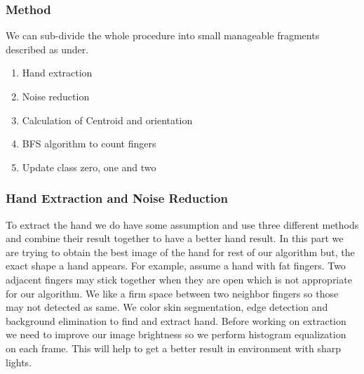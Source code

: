 \documentclass{report}
\begin{document}
\subsubsection{Method}
We can sub-divide the whole procedure into small manageable fragments described as under.
\begin{enumerate}

\item{Hand extraction}
\item{Noise reduction}
\item{Calculation of Centroid and orientation}
\item{BFS algorithm to count fingers}
\item{Update class zero, one and two}
\end{enumerate}
\subsubsection{Hand Extraction and Noise Reduction}
To extract the hand we do have some assumption and use three different methods and combine their result together to have a better hand result. In this part we are trying to obtain the best image of the hand for rest of our algorithm but, the exact shape a hand appears. For example, assume a hand with fat fingers. Two adjacent fingers may stick together when they are open which is not appropriate for our algorithm. We like a firm space between two neighbor fingers so those may not detected as same. We color skin segmentation, edge detection and background elimination to find and extract hand. Before working on extraction we need to improve our image brightness so we perform histogram equalization on each frame. This will help to get a better result in environment with sharp lights. 
\end{document}
